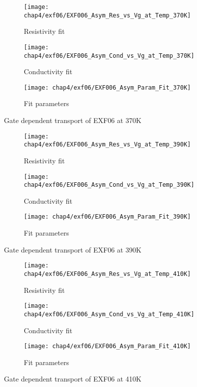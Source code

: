 \documentclass[../Matt_Gebert_Honours_Thesis.tex]{subfiles}
\begin{document}
	\begin{figure}[H]
		\centering
		\begin{subfigure}{0.4\textwidth}
			\centering
			\texttt{[image: chap4/exf06/EXF006\_Asym\_Res\_vs\_Vg\_at\_Temp\_370K]}
			\caption{Resistivity fit}
		\end{subfigure}
		\begin{subfigure}{0.4\textwidth}
			\centering
			\texttt{[image: chap4/exf06/EXF006\_Asym\_Cond\_vs\_Vg\_at\_Temp\_370K]}
			\caption{Conductivity fit}
		\end{subfigure}
		\begin{subfigure}{0.16\textwidth}
			\centering
			\texttt{[image: chap4/exf06/EXF006\_Asym\_Param\_Fit\_370K]}
			\caption{Fit parameters}
		\end{subfigure}
		\caption*{Gate dependent transport of EXF06 at 370K}
	\end{figure}
	\begin{figure}[H]
		\centering
		\begin{subfigure}{0.4\textwidth}
			\centering
			\texttt{[image: chap4/exf06/EXF006\_Asym\_Res\_vs\_Vg\_at\_Temp\_390K]}
			\caption{Resistivity fit}
		\end{subfigure}
		\begin{subfigure}{0.4\textwidth}
			\centering
			\texttt{[image: chap4/exf06/EXF006\_Asym\_Cond\_vs\_Vg\_at\_Temp\_390K]}
			\caption{Conductivity fit}
		\end{subfigure}
		\begin{subfigure}{0.16\textwidth}
			\centering
			\texttt{[image: chap4/exf06/EXF006\_Asym\_Param\_Fit\_390K]}
			\caption{Fit parameters}
		\end{subfigure}
		\caption*{Gate dependent transport of EXF06 at 390K}
	\end{figure}
	\begin{figure}[H]
		\centering
		\begin{subfigure}{0.4\textwidth}
			\centering
			\texttt{[image: chap4/exf06/EXF006\_Asym\_Res\_vs\_Vg\_at\_Temp\_410K]}
			\caption{Resistivity fit}
		\end{subfigure}
		\begin{subfigure}{0.4\textwidth}
			\centering
			\texttt{[image: chap4/exf06/EXF006\_Asym\_Cond\_vs\_Vg\_at\_Temp\_410K]}
			\caption{Conductivity fit}
		\end{subfigure}
		\begin{subfigure}{0.16\textwidth}
			\centering
			\texttt{[image: chap4/exf06/EXF006\_Asym\_Param\_Fit\_410K]}
			\caption{Fit parameters}
		\end{subfigure}
		\caption*{Gate dependent transport of EXF06 at 410K}
	\end{figure}
	
\end{document}
